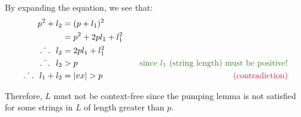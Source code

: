 \begin{problem}
\begin{enumalph}
\begin{Answer}
\begin{enumroman}
\begin{itemize}
              \step
              By expanding the equation, we see that:
              \begin{align*}
                p^2 + l_2 &= (p + l_1)^2 \\
                          &= p^2 + 2pl_1 + l_1^2 \\
                \Therefore l_2 &= 2pl_1 + l_1^2 \\
                \Therefore l_2 &> p \quad & \quad \green{\text{since $l_1$ (string length) must be positive!}} \\
                \Therefore l_1 + l_2 &= \abs{vx} > p &\crim{\text{(contradiction)}}
              \end{align*}
          \end{itemize}
      \end{enumroman}

      \step
      Therefore, $L$ must not be context-free since the pumping lemma
      is not satisfied for some strings in $L$ of length greater than $p$.
    \end{Answer}
  \end{enumalph}
\end{problem}
